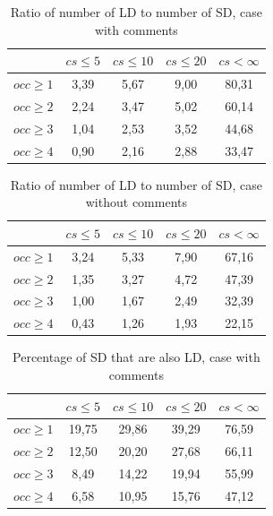 \documentclass[12pt]{mitthesis}
\begin{document}
\begin{table}[!h]
\renewcommand{\arraystretch}{1}
\caption{Ratio of number of LD to number of SD, case with comments}
\label{tab:ratio:comm}
\centering

\begin{tabular}{|c|c|c|c|c|}
\hline
	      &	$cs\leq 5$	&	$cs\leq 10$	&	$cs\leq 20$	&	$cs<\infty$	\\
\hline
$occ\geq 1$	&	3,39	&	5,67	&	9,00	&	80,31	\\
$occ\geq 2$	&	2,24	&	3,47	&	5,02	&	60,14	\\
$occ\geq 3$	&	1,04	&	2,53	&	3,52	&	44,68	\\
$occ\geq 4$	&	0,90	&	2,16	&	2,88	&	33,47	\\
\hline
\end{tabular}
\end{table}

\begin{table}[!h]
\renewcommand{\arraystretch}{1}
\caption{Ratio of number of LD to number of SD, case without comments}
\label{tab:ratio:nocomm}
\centering

\begin{tabular}{|c|c|c|c|c|}
\hline
	      &	$cs\leq 5$	&	$cs\leq 10$	&	$cs\leq 20$	&	$cs< \infty$	\\
\hline
$occ\geq 1$	&	3,24	&	5,33	&	7,90	&	67,16	\\
$occ\geq 2$	&	1,35	&	3,27	&	4,72	&	47,39	\\
$occ\geq 3$	&	1,00	&	1,67	&	2,49	&	32,39	\\
$occ\geq 4$	&	0,43	&	1,26	&	1,93	&	22,15	\\
\hline
\end{tabular}
\end{table}

\begin{table}[!h]
\renewcommand{\arraystretch}{1}
\caption{Percentage of SD that are also LD, case with comments}
\label{tab:percSD:comm}
\centering

\begin{tabular}{|c|c|c|c|c|}
\hline
	      &	$cs\leq 5$	&	$cs\leq 10$	&	$cs\leq 20$	&	$cs< \infty$	\\
\hline
$occ\geq 1$	&	19,75	&	29,86	&	39,29	&	76,59	\\
$occ\geq 2$	&	12,50	&	20,20	&	27,68	&	66,11	\\
$occ\geq 3$	&	8,49	&	14,22	&	19,94	&	55,99	\\
$occ\geq 4$	&	6,58	&	10,95	&	15,76	&	47,12	\\
\hline
\end{tabular}
\end{table}
\end{document}
